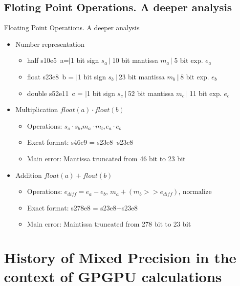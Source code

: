 \documentclass[10pt]{beamer}
\begin{document}
\subsection{Floting Point Operations. A deeper analysis}
\begin{frame}{Floating Point Operations. A deeper analysis}
\begin{itemize}
\item Number representation
\begin{itemize}
\item half s10e5~a=$\vert$1 bit sign $s_a~|~$10 bit mantissa $m_a~|~$5 bit exp. $e_a$ 
\item float s23e8~b = $\vert$1 bit sign $s_b~|~$23 bit mantissa $m_b~|~$8 bit exp. $e_b$ 
\item double s52e11~c = $\vert$1 bit sign $s_c~|~$52 bit mantissa $m_c~|~$11 bit exp. $e_c$ 
\end{itemize}
\item Multiplication $float(a) \cdot float(b)$
	\begin{itemize}
	\item Operations: $s_a \cdot s_b$,$m_a \cdot m_b$,$e_a \cdot e_b$
	\item Excat format: s46e9 = s23e8 $\cdot$s23e8
	\item Main error: Mantissa truncated from 46 bit to 23 bit
	\end{itemize}
\item Addition $float(a) + float(b)$
	\begin{itemize}
	\item Operations: $e_{diff} = e_a - e_b$, $m_a + (m_b >> e_{diff})$, 
			normalize
	\item Exact format: s278e8 = s23e8+s23e8
	\item Main error: Maintissa truncated from 278 bit to 23 bit
	\end{itemize}
\end{itemize}
\end{frame}

\section{History of Mixed Precision in the context of GPGPU calculations}
\end{document}
